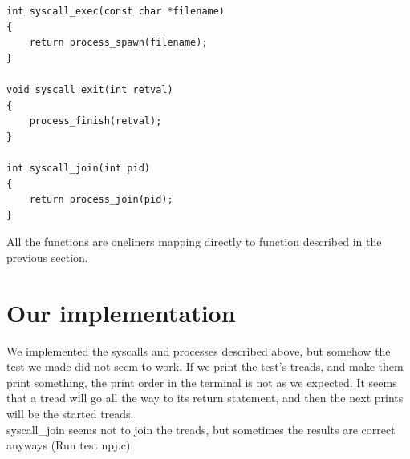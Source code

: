 \documentclass[11pt]{article}
\begin{document}
    \begin{lstlisting}[style=customc]
int syscall_exec(const char *filename)
{
    return process_spawn(filename);
}

void syscall_exit(int retval)
{
    process_finish(retval);
}

int syscall_join(int pid)
{
    return process_join(pid);
}
    \end{lstlisting}

    All the functions are oneliners mapping directly to function described in
    the previous section.

    \section{Our implementation}
    We implemented the syscalls and processes described above, but somehow the test we made did not seem to work. If we print the test's treads, and make them print something, the print order in the terminal is not as we expected. It seems that a tread will go all the way to its return statement, and then the next prints will be the started treads.
    \\
    syscall\_join seems not to join the treads, but sometimes the results are correct anyways (Run test npj.c)
    
\end{document}
